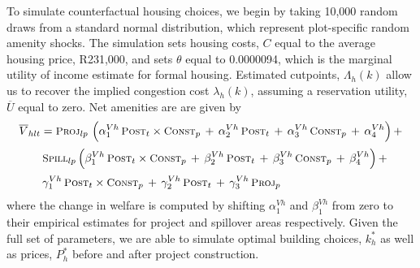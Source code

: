 \documentclass[12pt]{article}
\begin{document}
To simulate counterfactual housing choices, we begin by taking 10,000 random draws from a standard normal distribution, which represent plot-specific random amenity shocks.  The simulation sets housing costs, $C$ equal to the average housing price, R231,000, and sets $\theta$ equal to 0.0000094, which is the marginal utility of income estimate for formal housing.  Estimated cutpoints, $\Lambda_{h}(k)$ allow us to recover the implied congestion cost $\lambda_{h}(k)$, assuming a reservation utility, $\overline{U}$ equal to zero.   Net amenities are are given by 
\begin{align*}
 \overline{V}_{hlt} &=  \textsc{\small Proj}_{lp} \,\, \Big( \alpha^{Vh}_1 \, \textsc{\small Post}_{t}\times\textsc{\small Const}_{p} \, + \, \alpha^{Vh}_2 \, \textsc{\small Post}_{t} \, + \, \alpha^{Vh}_3 \, \textsc{\small Const}_{p}\, +\, \alpha^{Vh}_4 \Big) \, + \\[.2em]
& \, \textsc{\small Spill}_{lp} \, \Big( \beta^{Vh}_1 \, \textsc{\small Post}_{t}\times\textsc{\small Const}_{p} \, + \, \beta^{Vh}_2 \, \textsc{\small Post}_{t} \, + \, \beta^{Vh}_3 \, \textsc{\small Const}_{p} \, +\, \beta^{Vh}_4 \Big) \, + \\[.2em]
& \, \gamma^{Vh}_1 \,  \textsc{\small Post}_{t}\times\textsc{\small Const}_{p} \, + \, \gamma^{Vh}_2 \,\textsc{\small Post}_{t} \, + \, \gamma^{Vh}_3 \,  \textsc{\small Proj}_{p}
\end{align*}
\noindent where the change in welfare is computed by shifting $\alpha^{Vh}_1$ and $\beta^{Vh}_1$ from zero to their empirical estimates for project and spillover areas respectively.  Given the full set of parameters, we are able to simulate optimal building choices, $k^{*}_{h}$ as well as prices, $P^{*}_{h}$ before and after project construction.  
\end{document}
